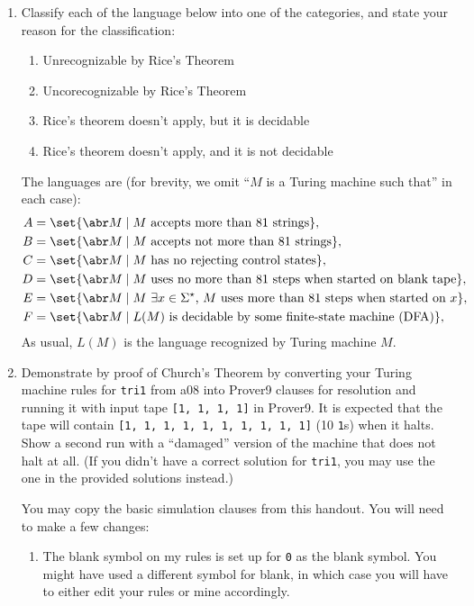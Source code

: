 \documentclass{cs81-homework}
\begin{document}
\begin{enumerate}
\item {} Classify each of the language below into one of the
  categories, and state your reason for the classification:
  \begin{enumerate}[label=\Roman*.]
  \item Unrecognizable by Rice's Theorem
  \item Uncorecognizable by Rice's Theorem
  \item Rice's theorem doesn't apply, but it is decidable
  \item Rice's theorem doesn't apply, and it is not decidable
  \end{enumerate}
  The languages are (for brevity, we omit ``\(M\) is a Turing machine such
  that'' in each case):
  \begin{align*}
    A &= \set{\abr M \mid \text{\(M\) accepts more than 81 strings}}, \\
    B &= \set{\abr M \mid \text{\(M\) accepts not more than 81 strings}}, \\
    C &= \set{\abr M \mid \text{\(M\) has no rejecting control states}}, \\
    D &= \set{\abr M \mid \text{\(M\) uses no more than 81 steps when started on blank tape}}, \\
    E &= \set{\abr M \mid \text{\(M\) \(\exists x \in \Sigma^\star\),
        \(M\) uses more than 81 steps when started on \(x\)}}, \\
    F &= \set{\abr M \mid \text{\(L(M)\) is decidable by some finite-state machine (DFA)}}, \\
  \end{align*}
  As usual, \(L(M)\) is the language recognized by Turing machine \(M\).

  \begin{solution}
  \end{solution}

\item {} Demonstrate by proof of Church's Theorem by converting your
  Turing machine rules for \texttt{tri1} from a08 into Prover9 clauses for
  resolution and running it with input tape \texttt{[1, 1, 1, 1]} in Prover9.
  It is expected that the tape will contain \texttt{[1, 1, 1, 1, 1, 1, 1, 1, 1,
    1]} (10 \texttt{1}s) when it halts.  Show a second run with a ``damaged''
  version of the machine that does not halt at all.  (If you didn't have a
  correct solution for \texttt{tri1}, you may use the one in the provided
  solutions instead.)

  You may copy the basic simulation clauses from this handout.  You will need to
  make a few changes:
  \begin{enumerate}[label=\alph*.]
  \item The blank symbol on my rules is set up for \texttt{0} as the blank
    symbol.  You might have used a different symbol for blank, in which case you
    will have to either edit your rules or mine accordingly.


\end{enumerate}
\end{enumerate}
\end{document}
